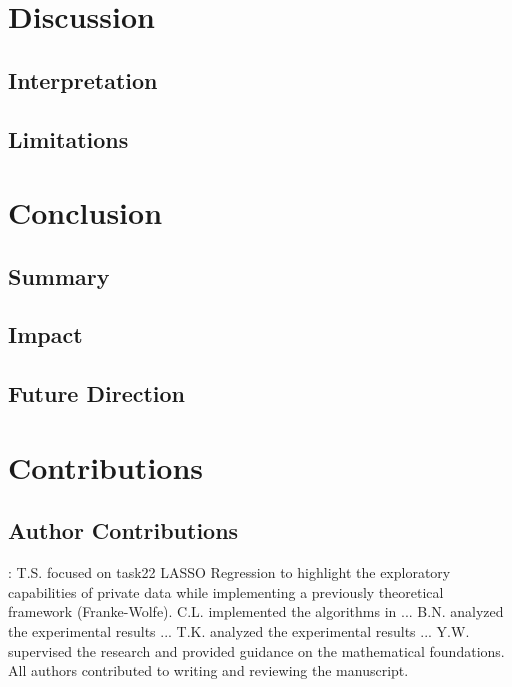 \documentclass[12pt,letterpaper]{article}
\begin{document}
\section{Discussion}


\subsection{Interpretation}


\subsection{Limitations}




\section{Conclusion}


\subsection{Summary}


\subsection{Impact}


\subsection{Future Direction}



\section{Contributions}

\subsection{Author Contributions}:
T.S. focused on task22 LASSO Regression to highlight the exploratory capabilities of private data while implementing a previously theoretical framework (Franke-Wolfe). C.L. implemented the algorithms in ... B.N. analyzed the experimental results ... T.K. analyzed the experimental results ... Y.W. supervised the research and provided guidance on the mathematical foundations. All authors contributed to writing and reviewing the manuscript.
\end{document}

